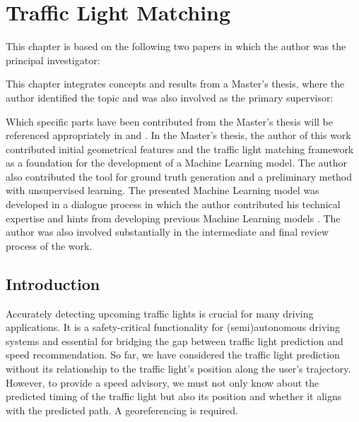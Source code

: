 \chapter{Traffic Light Matching}\label{ch:matching}

\begin{Summary}
This chapter is based on the following two papers in which the author was the principal investigator: 

\cite{matthes2022matching} 

\cite{matthes2023geo} 

This chapter integrates concepts and results from a Master's thesis, where the author identified the topic and was also involved as the primary supervisor:

\cite{jeschor_2022} 

Which specific parts have been contributed from the Master's thesis will be referenced appropriately in  and . In the Master's thesis, the author of this work contributed initial geometrical features and the traffic light matching framework as a foundation for the development of a Machine Learning model. The author also contributed the tool for ground truth generation and a preliminary method with unsupervised learning. The presented Machine Learning model was developed in a dialogue process in which the author contributed his technical expertise and hints from developing previous Machine Learning models \cite{matthes2022selecting}. The author was also involved substantially in the intermediate and final review process of the work.
\end{Summary}

\section{Introduction}

Accurately detecting upcoming traffic lights is crucial for many driving applications. It is a safety-critical functionality for (semi)autonomous driving systems and essential for bridging the gap between traffic light prediction and speed recommendation. So far, we have considered the traffic light prediction without its relationship to the traffic light's position along the user's trajectory. However, to provide a speed advisory, we must not only know about the predicted timing of the traffic light but also its position and whether it aligns with the predicted path. A georeferencing is required.

